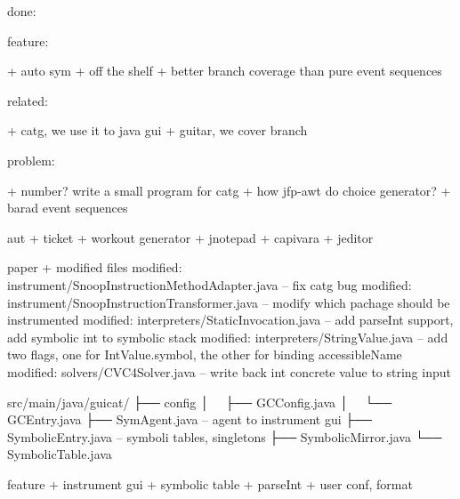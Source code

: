 done:

feature:

+ auto sym
+ off the shelf
+ better branch coverage than pure event sequences

related:

+ catg, we use it to java gui
+ guitar, we cover branch

problem:

+ number? write a small program for catg
+ how jfp-awt do choice generator?
+ barad event sequences


aut
+ ticket
+ workout generator
+ jnotepad
+ capivara
+ jeditor


paper
+ modified files
        modified:   instrument/SnoopInstructionMethodAdapter.java  -- fix catg bug
        modified:   instrument/SnoopInstructionTransformer.java  -- modify which pachage should be instrumented
        modified:   interpreters/StaticInvocation.java  -- add parseInt support, add symbolic int to symbolic stack
        modified:   interpreters/StringValue.java    -- add two flags, one for IntValue.symbol, the other for binding accessibleName
        modified:   solvers/CVC4Solver.java  -- write back int concrete value to string input


src/main/java/guicat/
├── config
│   ├── GCConfig.java
│   └── GCEntry.java
├── SymAgent.java    -- agent to instrument gui
├── SymbolicEntry.java  -- symboli tables, singletons
├── SymbolicMirror.java
└── SymbolicTable.java

feature
+ instrument gui
+ symbolic table
+ parseInt
+ user conf, format
